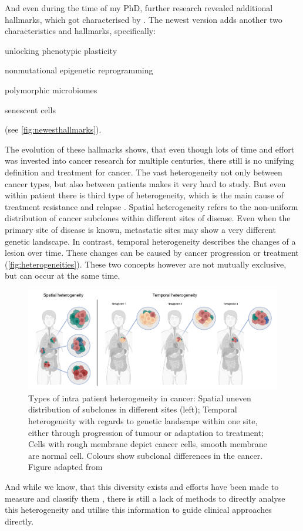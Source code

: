 And even during the time of my PhD, further research revealed additional hallmarks, which got characterised by \textcite{Hanahan2022}. The newest version adds another two characteristics and hallmarks, specifically:
\begin{enumerate*}
\item unlocking phenotypic plasticity 
\item nonmutational epigenetic reprogramming
\item polymorphic microbiomes
\item senescent cells
\end{enumerate*} 
(see \autoref{fig:newesthallmarks}).

The evolution of these hallmarks shows, that even though lots of time and effort was invested into cancer research for multiple centuries, there still is no unifying definition and treatment for cancer. The vast heterogeneity not only between cancer types, but also between patients makes it very hard to study. But even within patient there is third type of heterogeneity, which is the main cause of treatment resistance and relapse \cite{DagogoJack2017}. Spatial heterogeneity refers to the non-uniform distribution of cancer subclones within different sites of disease. Even when the primary site of disease is known, metastatic sites may show a very different genetic landscape. In contrast, temporal heterogeneity describes the changes of a lesion over time. These changes can be caused by cancer progression or treatment (\autoref{fig:heterogeneities}). These two concepts however are not mutually exclusive, but can occur at the same time.


\begin{figure}[ht]
\centering
\includegraphics[width=.95\linewidth]{Figures/intro/heterogeneities.pdf}
\caption[Intra patient heterogeneities in cancer]{Types of intra patient heterogeneity in cancer: Spatial uneven distribution of subclones in different sites (left); Temporal heterogeneity with regards to genetic landscape within one site, either through progression of tumour or adaptation to treatment; Cells with rough membrane depict cancer cells, smooth membrane are normal cell. Colours show subclonal differences in the cancer. Figure adapted from \protect\textcite{DagogoJack2017}}\label{fig:heterogeneities}
\end{figure}


And while we know, that this diversity exists and efforts have been made to measure and classify them \cite{Noorbakhsh2018}, there is still a lack of methods to directly analyse this heterogeneity and utilise this information to guide clinical approaches directly.

